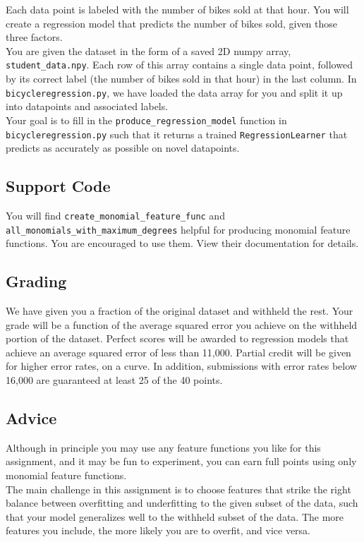 \documentclass{article}
\begin{document}
Each data point is labeled with the number of bikes sold at that hour.
You will create a regression model that predicts the number of bikes sold, given those three factors. ~\\

You are given the dataset in the form of a saved 2D numpy array, \verb|student_data.npy|.
Each row of this array contains a single data point, followed by its correct label (the number of bikes sold in that hour) in the last column.
In \verb|bicycleregression.py|, we have loaded the data array for you and split it up into datapoints and associated labels. ~\\

Your goal is to fill in the \verb|produce_regression_model| function in \verb|bicycleregression.py| such that it returns a trained \verb|RegressionLearner| that predicts as accurately as possible on novel datapoints.

\subsection{Support Code}
You will find \verb|create_monomial_feature_func| and \verb|all_monomials_with_maximum_degrees| helpful for producing monomial feature functions.
You are encouraged to use them.
View their documentation for details.

\subsection{Grading}
We have given you a fraction of the original dataset and withheld the rest.
Your grade will be a function of the average squared error you achieve on the withheld portion of the dataset.
Perfect scores will be awarded to regression models that achieve an average squared error of less than 11,000.
Partial credit will be given for higher error rates, on a curve.
In addition, submissions with error rates below 16,000 are guaranteed at least 25 of the 40 points. 

\subsection{Advice}
Although in principle you may use any feature functions you like for this assignment, and it may be fun to experiment, you can earn full points using only monomial feature functions.~\\

The main challenge in this assignment is to choose features that strike the right balance between overfitting and underfitting to the given subset of the data, such that your model generalizes well to the withheld subset of the data.
The more features you include, the more likely you are to overfit, and vice versa. ~\\
\end{document}
